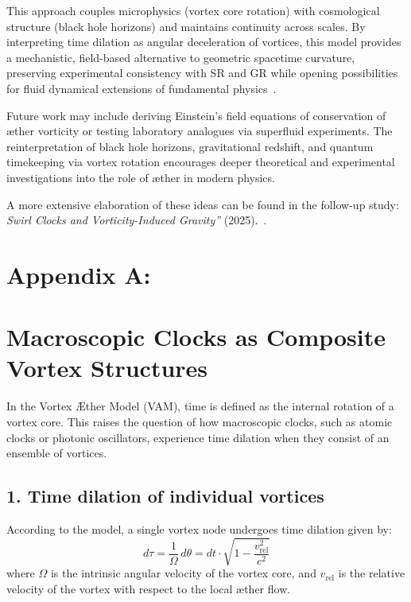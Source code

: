 \documentclass[a4paper,12pt]{article}
\begin{document}
This approach couples microphysics (vortex core rotation) with cosmological structure (black hole horizons) and maintains continuity across scales. By interpreting time dilation as angular deceleration of vortices, this model provides a mechanistic, field-based alternative to geometric spacetime curvature, preserving experimental consistency with SR and GR while opening possibilities for fluid dynamical extensions of fundamental physics~\cite{Winterberg2002-PlanckÆther, Schiller2022-maxforce}.

Future work may include deriving Einstein's field equations of conservation of æther vorticity or testing laboratory analogues via superfluid experiments. The reinterpretation of black hole horizons, gravitational redshift, and quantum timekeeping via vortex rotation encourages deeper theoretical and experimental investigations into the role of æther in modern physics.

A more extensive elaboration of these ideas can be found in the follow-up study: \textit{\grqq Swirl Clocks and Vorticity-Induced Gravity\textquotedblright } (2025).~\cite{iskandarani2025vam2}.
\section*{Appendix A:}
\label{appendix:ClocksInVortexStructures}
\section*{Macroscopic Clocks as Composite Vortex Structures}
In the Vortex Æther Model (VAM), time is defined as the internal rotation of a vortex core. This raises the question of how macroscopic clocks, such as atomic clocks or photonic oscillators, experience time dilation when they consist of an ensemble of vortices.

\subsection*{1. Time dilation of individual vortices}

According to the model, a single vortex node undergoes time dilation given by:
\begin{equation}
d\tau = \frac{1}{\Omega} \, d\theta = dt \cdot \sqrt{1 - \frac{v_\text{rel}^2}{c^2}} \label{eq:single_tau}
\end{equation}
where \( \Omega \) is the intrinsic angular velocity of the vortex core, and \( v_\text{rel} \) is the relative velocity of the vortex with respect to the local æther flow.
\end{document}
